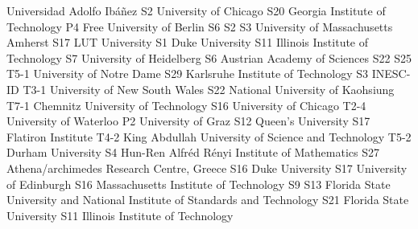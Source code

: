 \begin{multicols}{2}
{Universidad Adolfo Ib\'a\~nez}
{S2}
{}
{}
{}
{}
{}
{}
{University of Chicago}
{S20}
{}
{}
{}
{}
{}
{}
{Georgia Institute of Technology}
{P4}
{}
{}
{}
{}
{}
{}
{Free University of Berlin}
{S6}
{S2}
{S3}
{}
{}
{}
{}
{University of Massachusetts Amherst}
{S17}
{}
{}
{}
{}
{}
{}
{LUT University}
{S1}
{}
{}
{}
{}
{}
{}
{Duke University}
{S11}
{}
{}
{}
{}
{}
{}
{Illinois Institute of Technology}
{S7}
{}
{}
{}
{}
{}
{}
{University of Heidelberg}
{S6}
{}
{}
{}
{}
{}
{}
{Austrian Academy of Sciences}
{S22}
{S25}
{T5-1}
{}
{}
{}
{}
{University of Notre Dame}
{S29}
{}
{}
{}
{}
{}
{}
{Karlsruhe Institute of Technology}
{S3}
{}
{}
{}
{}
{}
{}
{INESC-ID}
{T3-1}
{}
{}
{}
{}
{}
{}
{University of New South Wales}
{S22}
{}
{}
{}
{}
{}
{}
{National University of Kaohsiung}
{T7-1}
{}
{}
{}
{}
{}
{}
{Chemnitz University of Technology}
{S16}
{}
{}
{}
{}
{}
{}
{University of Chicago}
{T2-4}
{}
{}
{}
{}
{}
{}
{University of Waterloo}
{P2}
{}
{}
{}
{}
{}
{}
{University of Graz}
{S12}
{}
{}
{}
{}
{}
{}
{Queen's University}
{S17}
{}
{}
{}
{}
{}
{}
{Flatiron Institute}
{T4-2}
{}
{}
{}
{}
{}
{}
{King Abdullah University of Science and Technology}
{T5-2}
{}
{}
{}
{}
{}
{}
{Durham University}
{S4}
{}
{}
{}
{}
{}
{}
{Hun-Ren Alfr\'ed R\'enyi Institute of Mathematics}
{S27}
{}
{}
{}
{}
{}
{}
{Athena/archimedes Research Centre, Greece}
{S16}
{}
{}
{}
{}
{}
{}
{Duke University}
{S17}
{}
{}
{}
{}
{}
{}
{University of Edinburgh}
{S16}
{}
{}
{}
{}
{}
{}
{Massachusetts Institute of Technology}
{S9}
{S13}
{}
{}
{}
{}
{}
{Florida State University and National Institute of Standards and Technology}
{S21}
{}
{}
{}
{}
{}
{}
{Florida State University}
{S11}
{}
{}
{}
{}
{}
{}
{Illinois Institute of Technology}

\end{multicols}
